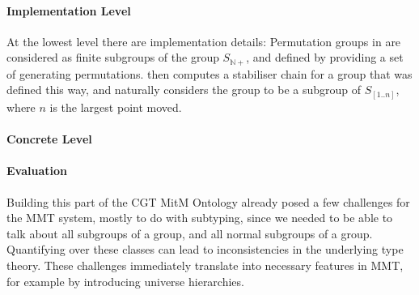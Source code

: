 \paragraph{Implementation Level}
At the lowest level there are implementation details: Permutation groups in \GAP
are considered as finite subgroups of the group $S_{\mathbb{N}+}$, and defined by
providing a set of generating permutations. \GAP then computes a stabiliser chain
for a group that was defined this way, and naturally considers the group to be a
subgroup of $S_{[1..n]}$, where $n$ is the largest point moved.

\paragraph{Concrete Level}

\paragraph{Evaluation}
Building this part of the CGT MitM Ontology already posed a few challenges for
the MMT system, mostly to do with subtyping, since we needed to be able to talk
about all subgroups of a group, and all normal subgroups of a group. Quantifying
over these classes can lead to inconsistencies in the underlying type theory.
These challenges immediately translate into necessary
features in MMT, for example by introducing universe hierarchies.


